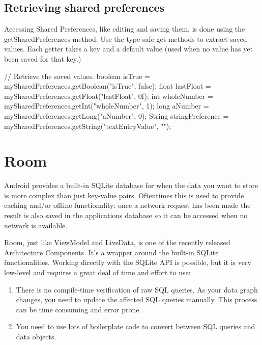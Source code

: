 \subsection{Retrieving shared preferences}
Accessing Shared Preferences, like editing and saving them, is done using the getSharedPreferences method. Use the type-safe get methods to extract saved values. Each getter takes a key and a default value (used when no value has yet been saved for that key.)

\begin{android}
// Retrieve the saved values.
boolean isTrue = mySharedPreferences.getBoolean("isTrue", false);
float lastFloat = mySharedPreferences.getFloat("lastFloat", 0f);
int wholeNumber = mySharedPreferences.getInt("wholeNumber", 1);
long aNumber = mySharedPreferences.getLong("aNumber", 0);
String stringPreference =
mySharedPreferences.getString("textEntryValue", "");
\end{android}

\section{Room}
Android provides a built-in SQLite database for when the data you want to store is more complex than just key-value pairs.
Oftentimes this is used to provide caching and/or offline functionality: once a network request has been made the result is also saved in the applications database so it can be accessed when no network is available.

Room, just like ViewModel and LiveData, is one of the recently released Architecture Components.
It's a wrapper around the built-in SQLite functionalities.
Working directly with the SQLite API is possible, but it is very low-level and requires a great deal of time and effort to use: \cite{Sqlite}
\begin{enumerate}
	\item There is no compile-time verification of raw SQL queries.
	As your data graph changes, you need to update the affected SQL queries manually.
	This process can be time consuming and error prone.
	\item You need to use lots of boilerplate code to convert between SQL queries and data objects.
\end{enumerate}


